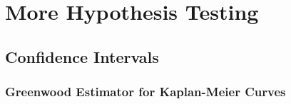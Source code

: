 \chapter{More Hypothesis Testing \label{chapter:hypothesisii}}


\section{Confidence Intervals}

\subsection{Greenwood Estimator for Kaplan-Meier Curves}

